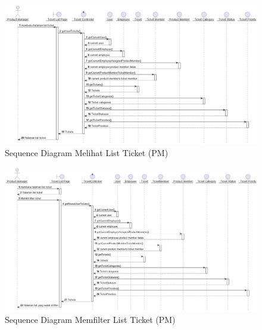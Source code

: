 \documentclass[12pt]{article}
\begin{document}
\begin{enumerate}[label=\textbf{4.\arabic*.}]
\begin{enumerate} [label=\textbf{4.2.\arabic*.}, wide, labelwidth=!, labelindent=0pt]
\begin{enumerate}[label=\textbf{4.2.2.\arabic*.}, wide, labelwidth=!, labelindent=0pt]
\begin{enumerate}[label=\arabic*.]
\begin{tabularx}{.9\linewidth}{@{} l l X @{}}
                \end{tabularx}
            
                
                \begin{figure}
                    \centering \includegraphics[width=\textwidth]{out/plantuml/sequence/ipm/ipm1/Melihat List Ticket.png}
                    \caption{Sequence Diagram Melihat List Ticket (PM)}
                    \label{fig:SQ-PM-01}
                \end{figure}

                \begin{figure}
                    \centering \includegraphics[width=\textwidth]{out/plantuml/sequence/ipm/ipm2/Memfilter List Ticket.png}
                    \caption{Sequence Diagram Memfilter List Ticket (PM)}
                    \label{fig:SQ-PM-02}
                \end{figure}


\end{enumerate}
\end{enumerate}
\end{enumerate}
\end{enumerate}
\end{document}

